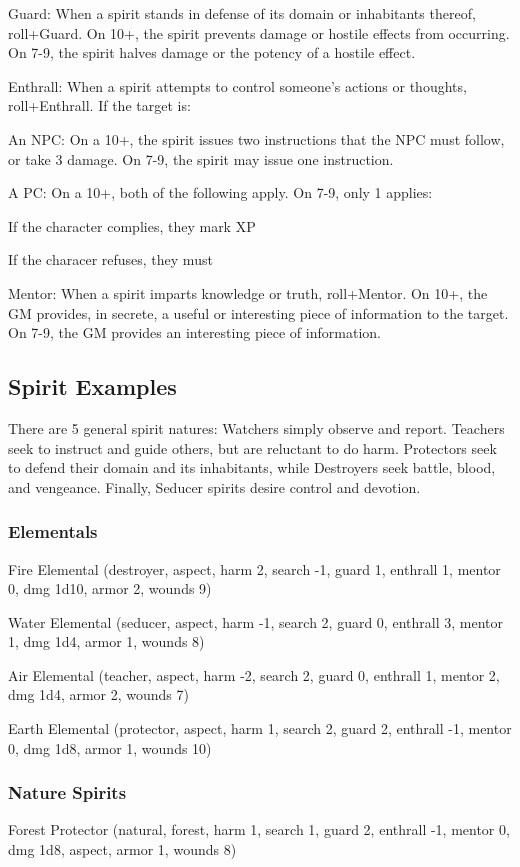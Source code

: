 Guard: When a spirit stands in defense of its domain or inhabitants thereof, roll+Guard. On 10+, the spirit prevents damage or hostile effects from occurring. On 7-9, the spirit halves damage or the potency of a hostile effect.

Enthrall: When a spirit attempts to control someone’s actions or thoughts, roll+Enthrall. If the target is:

    An NPC: On a 10+, the spirit issues two instructions that the NPC must follow, or take 3 damage. On 7-9, the spirit may issue one instruction.

    A PC: On a 10+, both of the following apply. On 7-9, only 1 applies:

    If the character complies, they mark XP

    If the characer refuses, they must 

Mentor: When a spirit imparts knowledge or truth, roll+Mentor. On 10+, the GM provides, in secrete, a useful or interesting piece of information to the target. On 7-9, the GM provides an interesting piece of information.


\subsection{Spirit Examples}
There are 5 general spirit natures: Watchers simply observe and report. Teachers seek to instruct and guide others, but are reluctant to do harm. Protectors seek to defend their domain and its inhabitants, while Destroyers seek battle, blood, and vengeance. Finally, Seducer spirits desire control and devotion.

\subsubsection{Elementals}
Fire Elemental (destroyer, aspect, harm 2, search -1, guard 1, enthrall 1, mentor 0, dmg 1d10, armor 2, wounds 9)

Water Elemental (seducer, aspect, harm -1, search 2, guard 0, enthrall 3, mentor 1, dmg 1d4, armor 1, wounds 8)

Air Elemental (teacher, aspect, harm -2, search 2, guard 0, enthrall 1, mentor 2, dmg 1d4, armor 2, wounds 7)

Earth Elemental (protector, aspect, harm 1, search 2, guard 2, enthrall -1, mentor 0, dmg 1d8, armor 1, wounds 10)

\subsubsection{Nature Spirits}
Forest Protector (natural, forest, harm 1, search 1, guard 2, enthrall -1, mentor 0, dmg 1d8, aspect, armor 1, wounds 8)

